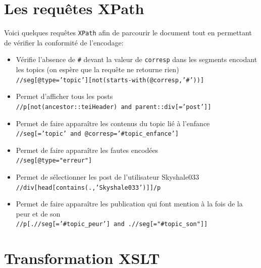 \documentclass[onecolumn,12pt]{article}
\begin{document}
\section{Les requêtes XPath}
Voici quelques requêtes \texttt{XPath} afin de parcourir le document tout en permettant de vérifier la conformité de l'encodage:
\begin{itemize}
    \item Vérifie l'absence de \texttt{\#} devant la valeur de \texttt{corresp} dans les segments encodant les topics (on espère que la requête ne retourne rien)\\
\texttt{//seg[@type='topic'][not(starts-with(@corresp,'\#'))]}

\item Permet d'afficher tous les posts\\
\texttt{//p[not(ancestor::teiHeader) and parent::div[\@type='post']]}

\item Permet de faire apparaître les contenus du topic lié à l'enfance\\ 
\texttt{//seg[\@type='topic' and @corresp='\#topic\_enfance']}

\item Permet de faire apparaître les fautes encodées\\
\texttt{//seg[@type="erreur"]}


\item Permet de sélectionner les post de l'utilisateur Skyshale033\\
\texttt{//div[head[contains(.,'Skyshale033')]]/p}


\item Permet de faire apparaître les publication qui font mention à la fois de la peur et de son\\
\texttt{//p[.//seg[\@corresp='\#topic\_peur'] and .//seg[\@corresp="\#topic\_son"]]}


\end{itemize}
\section{Transformation XSLT}
\end{document}
